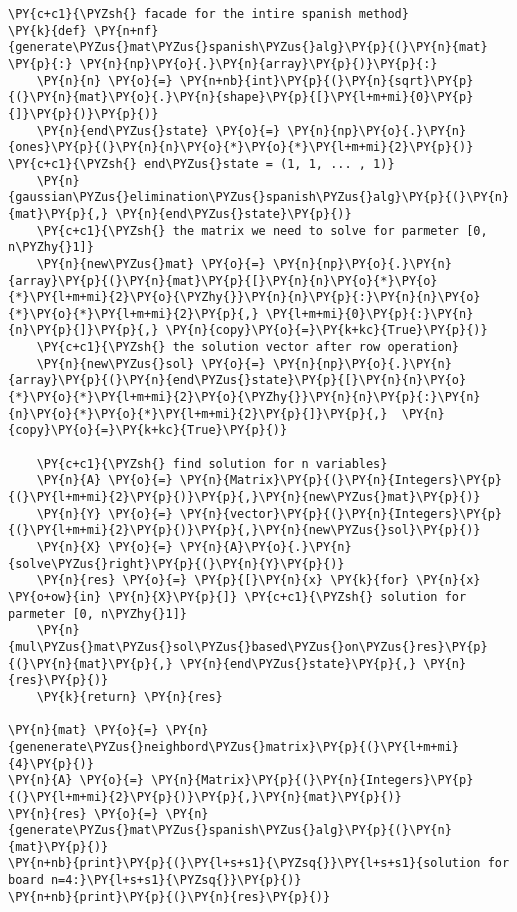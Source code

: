 \begin{english}
\begin{tcolorbox}[breakable, size=fbox, boxrule=1pt, pad at break*=1mm,colback=cellbackground, colframe=cellborder]
\begin{Verbatim}[commandchars=\\\{\}]
\PY{c+c1}{\PYZsh{} facade for the intire spanish method}
\PY{k}{def} \PY{n+nf}{generate\PYZus{}mat\PYZus{}spanish\PYZus{}alg}\PY{p}{(}\PY{n}{mat} \PY{p}{:} \PY{n}{np}\PY{o}{.}\PY{n}{array}\PY{p}{)}\PY{p}{:}
    \PY{n}{n} \PY{o}{=} \PY{n+nb}{int}\PY{p}{(}\PY{n}{sqrt}\PY{p}{(}\PY{n}{mat}\PY{o}{.}\PY{n}{shape}\PY{p}{[}\PY{l+m+mi}{0}\PY{p}{]}\PY{p}{)}\PY{p}{)}
    \PY{n}{end\PYZus{}state} \PY{o}{=} \PY{n}{np}\PY{o}{.}\PY{n}{ones}\PY{p}{(}\PY{n}{n}\PY{o}{*}\PY{o}{*}\PY{l+m+mi}{2}\PY{p}{)} \PY{c+c1}{\PYZsh{} end\PYZus{}state = (1, 1, ... , 1)}
    \PY{n}{gaussian\PYZus{}elimination\PYZus{}spanish\PYZus{}alg}\PY{p}{(}\PY{n}{mat}\PY{p}{,} \PY{n}{end\PYZus{}state}\PY{p}{)}
    \PY{c+c1}{\PYZsh{} the matrix we need to solve for parmeter [0, n\PYZhy{}1]}
    \PY{n}{new\PYZus{}mat} \PY{o}{=} \PY{n}{np}\PY{o}{.}\PY{n}{array}\PY{p}{(}\PY{n}{mat}\PY{p}{[}\PY{n}{n}\PY{o}{*}\PY{o}{*}\PY{l+m+mi}{2}\PY{o}{\PYZhy{}}\PY{n}{n}\PY{p}{:}\PY{n}{n}\PY{o}{*}\PY{o}{*}\PY{l+m+mi}{2}\PY{p}{,} \PY{l+m+mi}{0}\PY{p}{:}\PY{n}{n}\PY{p}{]}\PY{p}{,} \PY{n}{copy}\PY{o}{=}\PY{k+kc}{True}\PY{p}{)}
    \PY{c+c1}{\PYZsh{} the solution vector after row operation}
    \PY{n}{new\PYZus{}sol} \PY{o}{=} \PY{n}{np}\PY{o}{.}\PY{n}{array}\PY{p}{(}\PY{n}{end\PYZus{}state}\PY{p}{[}\PY{n}{n}\PY{o}{*}\PY{o}{*}\PY{l+m+mi}{2}\PY{o}{\PYZhy{}}\PY{n}{n}\PY{p}{:}\PY{n}{n}\PY{o}{*}\PY{o}{*}\PY{l+m+mi}{2}\PY{p}{]}\PY{p}{,}  \PY{n}{copy}\PY{o}{=}\PY{k+kc}{True}\PY{p}{)}
    
    \PY{c+c1}{\PYZsh{} find solution for n variables}
    \PY{n}{A} \PY{o}{=} \PY{n}{Matrix}\PY{p}{(}\PY{n}{Integers}\PY{p}{(}\PY{l+m+mi}{2}\PY{p}{)}\PY{p}{,}\PY{n}{new\PYZus{}mat}\PY{p}{)}
    \PY{n}{Y} \PY{o}{=} \PY{n}{vector}\PY{p}{(}\PY{n}{Integers}\PY{p}{(}\PY{l+m+mi}{2}\PY{p}{)}\PY{p}{,}\PY{n}{new\PYZus{}sol}\PY{p}{)}
    \PY{n}{X} \PY{o}{=} \PY{n}{A}\PY{o}{.}\PY{n}{solve\PYZus{}right}\PY{p}{(}\PY{n}{Y}\PY{p}{)}
    \PY{n}{res} \PY{o}{=} \PY{p}{[}\PY{n}{x} \PY{k}{for} \PY{n}{x} \PY{o+ow}{in} \PY{n}{X}\PY{p}{]} \PY{c+c1}{\PYZsh{} solution for parmeter [0, n\PYZhy{}1]}
    \PY{n}{mul\PYZus{}mat\PYZus{}sol\PYZus{}based\PYZus{}on\PYZus{}res}\PY{p}{(}\PY{n}{mat}\PY{p}{,} \PY{n}{end\PYZus{}state}\PY{p}{,} \PY{n}{res}\PY{p}{)}
    \PY{k}{return} \PY{n}{res}

\PY{n}{mat} \PY{o}{=} \PY{n}{genenerate\PYZus{}neighbord\PYZus{}matrix}\PY{p}{(}\PY{l+m+mi}{4}\PY{p}{)}
\PY{n}{A} \PY{o}{=} \PY{n}{Matrix}\PY{p}{(}\PY{n}{Integers}\PY{p}{(}\PY{l+m+mi}{2}\PY{p}{)}\PY{p}{,}\PY{n}{mat}\PY{p}{)}
\PY{n}{res} \PY{o}{=} \PY{n}{generate\PYZus{}mat\PYZus{}spanish\PYZus{}alg}\PY{p}{(}\PY{n}{mat}\PY{p}{)}
\PY{n+nb}{print}\PY{p}{(}\PY{l+s+s1}{\PYZsq{}}\PY{l+s+s1}{solution for board n=4:}\PY{l+s+s1}{\PYZsq{}}\PY{p}{)}
\PY{n+nb}{print}\PY{p}{(}\PY{n}{res}\PY{p}{)}


\end{Verbatim}
\end{tcolorbox}
\end{english}

